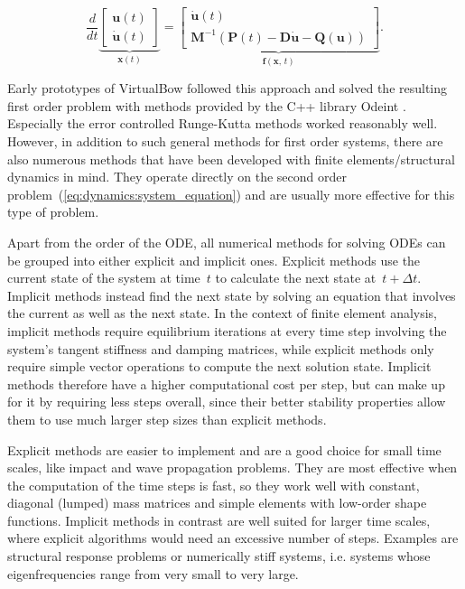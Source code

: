 \begin{equation}
\frac{d}{dt}
\underbrace{
\begin{bmatrix}
\boldsymbol{u}(t) \\
\dot{\boldsymbol{u}}(t)
\end{bmatrix}
}_{\boldsymbol{x}(t)}
=
\underbrace{
\begin{bmatrix}
\dot{\boldsymbol{u}}(t) \\
\boldsymbol{M}^{-1}\left(\boldsymbol{P}(t) - \boldsymbol{D}\dot{\boldsymbol{u}} - \boldsymbol{Q}(\boldsymbol{u})\right)
\end{bmatrix}
}_{\boldsymbol{f}(\boldsymbol{x},\,t)}.
\end{equation}

Early prototypes of VirtualBow followed this approach and solved the resulting first order problem with methods provided by the C++ library Odeint \cite{bib:ahnert2011}.
Especially the error controlled Runge-Kutta methods worked reasonably well.
However, in addition to such general methods for first order systems, there are also numerous methods that have been developed with finite elements/structural dynamics in mind.
They operate directly on the second order problem~(\ref{eq:dynamics:system_equation}) and are usually more effective for this type of problem.

Apart from the order of the ODE, all numerical methods for solving ODEs can be grouped into either explicit and implicit ones.
Explicit methods use the current state of the system at time~$t$ to calculate the next state at~$t + \Delta t$.
Implicit methods instead find the next state by solving an equation that involves the current as well as the next state.
In the context of finite element analysis, implicit methods require equilibrium iterations at every time step involving the system's tangent stiffness and damping matrices, while explicit methods only require simple vector operations to compute the next solution state.
Implicit methods therefore have a higher computational cost per step, but can make up for it by requiring less steps overall, since their better stability properties allow them to use much larger step sizes than explicit methods.

Explicit methods are easier to implement and are a good choice for small time scales, like impact and wave propagation problems.
They are most effective when the computation of the time steps is fast, so they work well with constant, diagonal (lumped) mass matrices and simple elements with low-order shape functions.
Implicit methods in contrast are well suited for larger time scales, where explicit algorithms would need an excessive number of steps.
Examples are structural response problems or numerically stiff systems, i.e. systems whose eigenfrequencies range from very small to very large.

